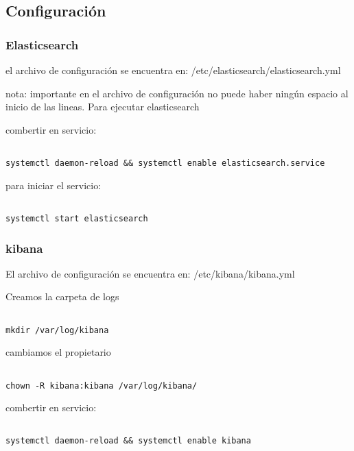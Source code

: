  \subsection{Configuración}
 
 \subsubsection{Elasticsearch}
 el archivo de configuración se encuentra en: /etc/elasticsearch/elasticsearch.yml
 
 nota: importante en el archivo de configuración no puede haber ningún espacio al inicio de las lineas.
 Para ejecutar elasticsearch
 
       
combertir en servicio:
\begin{lstlisting}[frame=single] 

systemctl daemon-reload && systemctl enable elasticsearch.service
\end{lstlisting}
 
 para iniciar el servicio:
 
\begin{lstlisting}[frame=single] 

systemctl start elasticsearch
\end{lstlisting}
 
\subsubsection{kibana}

El archivo de configuración se encuentra en: /etc/kibana/kibana.yml
 
 Creamos la carpeta de logs
 
\begin{lstlisting}[frame=single]  

mkdir /var/log/kibana

\end{lstlisting}

cambiamos el propietario

\begin{lstlisting}[frame=single]  

chown -R kibana:kibana /var/log/kibana/

\end{lstlisting}

combertir en servicio:

\begin{lstlisting}[frame=single]  

systemctl daemon-reload && systemctl enable kibana
\end{lstlisting}
 

